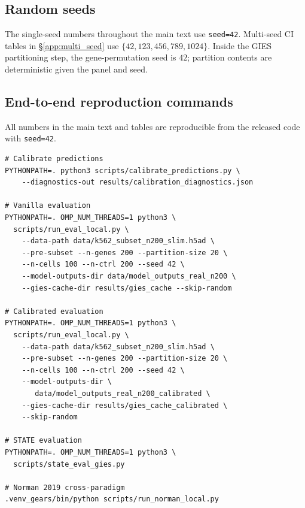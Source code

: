 \documentclass{article}
\begin{document}
\subsection{Random seeds}
\label{app:seeds}

The single-seed numbers throughout the main text use \texttt{seed=42}. Multi-seed CI tables in \S\ref{app:multi_seed} use $\{42, 123, 456, 789, 1024\}$. Inside the GIES partitioning step, the gene-permutation seed is $42$; partition contents are deterministic given the panel and seed.

\subsection{End-to-end reproduction commands}
\label{app:commands}

All numbers in the main text and tables are reproducible from the released code with \texttt{seed=42}.

\begin{verbatim}
# Calibrate predictions
PYTHONPATH=. python3 scripts/calibrate_predictions.py \
    --diagnostics-out results/calibration_diagnostics.json

# Vanilla evaluation
PYTHONPATH=. OMP_NUM_THREADS=1 python3 \
  scripts/run_eval_local.py \
    --data-path data/k562_subset_n200_slim.h5ad \
    --pre-subset --n-genes 200 --partition-size 20 \
    --n-cells 100 --n-ctrl 200 --seed 42 \
    --model-outputs-dir data/model_outputs_real_n200 \
    --gies-cache-dir results/gies_cache --skip-random

# Calibrated evaluation
PYTHONPATH=. OMP_NUM_THREADS=1 python3 \
  scripts/run_eval_local.py \
    --data-path data/k562_subset_n200_slim.h5ad \
    --pre-subset --n-genes 200 --partition-size 20 \
    --n-cells 100 --n-ctrl 200 --seed 42 \
    --model-outputs-dir \
       data/model_outputs_real_n200_calibrated \
    --gies-cache-dir results/gies_cache_calibrated \
    --skip-random

# STATE evaluation
PYTHONPATH=. OMP_NUM_THREADS=1 python3 \
  scripts/state_eval_gies.py

# Norman 2019 cross-paradigm
.venv_gears/bin/python scripts/run_norman_local.py
\end{verbatim}
\end{document}
